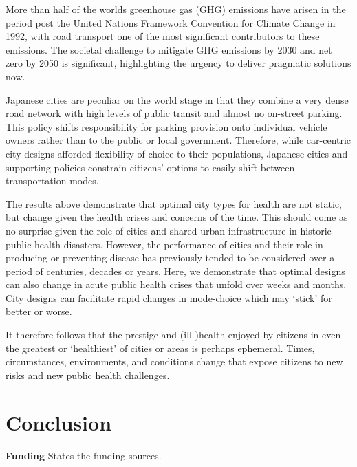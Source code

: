 \documentclass[preprint,12pt]{elsarticle}
\begin{document}
More than half of the worlds greenhouse gas (GHG) emissions have arisen in the period post the United Nations Framework Convention for Climate Change in 1992\cite{bashmakov2022climate}, with road transport one of the most significant contributors to these emissions. The societal challenge to mitigate GHG emissions by 2030 and net zero by 2050\cite{lynskey2020moving} is significant, highlighting the urgency to deliver pragmatic solutions now.

Japanese cities are peculiar on the world stage in that they combine a very dense road network with high levels of public transit and almost no on-street parking. This policy shifts responsibility for parking provision onto individual vehicle owners rather than to the public or local government. Therefore, while car-centric city designs afforded flexibility of choice to their populations, Japanese cities and supporting policies constrain citizens' options to easily shift between transportation modes.

The results above demonstrate that optimal city types for health are not static, but change given the health crises and concerns of the time. This should come as no surprise given the role of cities and shared urban infrastructure in historic public health disasters. However, the performance of cities and their role in producing or preventing disease has previously tended to be considered over a period of centuries, decades or years. Here, we demonstrate that optimal designs can also change in acute public health crises that unfold over weeks and months. City designs can facilitate rapid changes in mode-choice which may `stick' for better or worse. 

It therefore follows that the prestige and (ill-)health enjoyed by citizens in even the greatest or `healthiest' of cities or areas is perhaps ephemeral. Times, circumstances, environments, and conditions change that expose citizens to new risks and new public health challenges.


\section*{Conclusion}

\textbf{Funding} States the funding sources.
\end{document}
